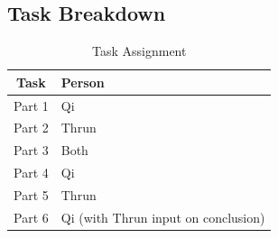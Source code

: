 \documentclass{article}
\begin{document}
\vspace{0.5in}
\subsection*{Task Breakdown}

\begin{table}[H]
    \centering
    \begin{tabular}{cl}
        \toprule
        \textbf{Task} & \textbf{Person}\\
        \midrule
        Part 1 & Qi \\
        Part 2 & Thrun \\
        Part 3 & Both \\
        Part 4 & Qi \\
        Part 5 & Thrun \\
        Part 6 & Qi (with Thrun input on conclusion)\\
        \bottomrule
    \end{tabular}
    \caption{Task Assignment}
\end{table}
\end{document}
